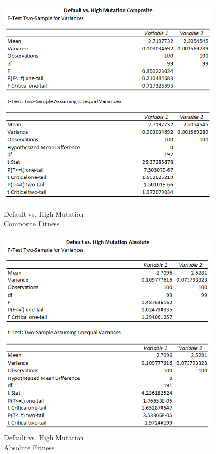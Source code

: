 \documentclass[11pt]{article}
\begin{document}
\begin{figure}[ht]
\centering
\begin{minipage}{.48\textwidth}
  \includegraphics[width=1.0\textwidth]{default_vs_high_comp.png}
  \caption{Default vs. High Mutation \\Composite Fitness}
  \label{fig:default_vs_high_comp}
\end{minipage}\hfill
\begin{minipage}{.48\textwidth}
  \includegraphics[width=1.0\textwidth]{default_vs_high_abs.png}
  \caption{Default vs. High Mutation \\Absolute Fitness}
  \label{fig:default_vs_high_abs}
\end{minipage}
\end{figure}
\end{document}
